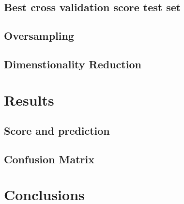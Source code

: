 \documentclass{article}
\begin{document}
\subsection {Best cross validation score test set}

\subsection{Oversampling}

\subsection{Dimenstionality Reduction}

\section{Results}

\subsection{Score and prediction}

\subsection{Confusion Matrix}

\section{Conclusions}



\end{document}
